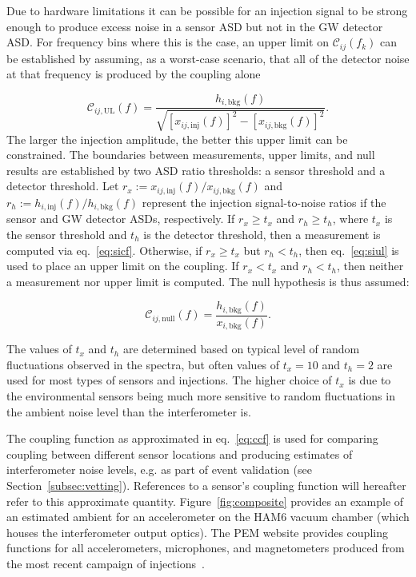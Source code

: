 Due to hardware limitations it can be possible for an injection signal to be strong enough to produce excess noise in a sensor \ac{ASD} but not in the \ac{GW} detector \ac{ASD}.
For frequency bins where this is the case, an upper limit on $\mathcal{C}_{ij}(f_k)$ can be established by assuming, as a worst-case scenario, that all of the detector noise at that frequency is produced by the coupling alone

\begin{equation}\label{eq:siul}
	\mathcal{C}_{ij, \mathrm{UL}}(f) = \frac{h_{i,\textrm{bkg}}(f)}{\sqrt{[x_{ij,\textrm{inj}}(f)]^2 - [x_{ij,\textrm{bkg}}(f)]^2}}.
\end{equation}
The larger the injection amplitude, the better this upper limit can be constrained.
The boundaries between measurements, upper limits, and null results are established by two \ac{ASD} ratio thresholds: a sensor threshold and a detector threshold.
Let $r_x := x_{ij,\textrm{inj}}(f) / x_{ij,\textrm{bkg}}(f)$ and $r_h := h_{i,\textrm{inj}}(f) / h_{i,\textrm{bkg}}(f)$ represent the injection signal-to-noise ratios if the sensor and \ac{GW} detector \acp{ASD}, respectively.
If $r_x \geq t_x$ and $r_h \geq t_h$, where $t_x$ is the sensor threshold and $t_h$ is the detector threshold, then a measurement is computed via eq.~\ref{eq:sicf}.
Otherwise, if $r_x \geq t_x$ but $r_h < t_h$, then eq.~\ref{eq:siul} is used to place an upper limit on the coupling.
If $r_x < t_x$ and $r_h < t_h$, then neither a measurement nor upper limit is computed.
The null hypothesis is thus assumed:

\begin{equation}\label{eq:sinull}
	\mathcal{C}_{ij, \mathrm{null}}(f) = \frac{h_{i,\textrm{bkg}}(f)}{x_{i,\textrm{bkg}}(f)}.
\end{equation}

The values of $t_x$ and $t_h$ are determined based on typical level of random fluctuations observed in the spectra, but often values of $t_x = 10$ and $t_h = 2$ are used for most types of sensors and injections.
The higher choice of $t_x$ is due to the environmental sensors being much more sensitive to random fluctuations in the ambient noise level than the interferometer is.

The coupling function as approximated in eq.~\ref{eq:ccf} is used for comparing coupling between different sensor locations and producing estimates of interferometer noise levels, e.g. as part of event validation (see Section~\ref{subsec:vetting}).
References to a sensor's coupling function will hereafter refer to this approximate quantity.
Figure~\ref{fig:composite} provides an example of an estimated ambient for an accelerometer on the HAM6 vacuum chamber (which houses the interferometer output optics).
The \ac{PEM} website provides coupling functions for all accelerometers, microphones, and magnetometers produced from the most recent campaign of injections~\citep{PEM_website}.

